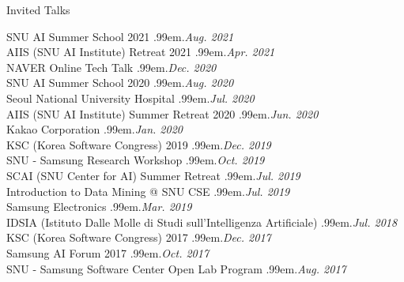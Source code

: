 \documentclass{resume} %
\makeatletter
\newcommand \Dotfill {\leavevmode \cleaders \hb@xt@ .99em{\hss .\hss }\hfill \kern \z@}
\makeatother
\begin{document}
\begin{rSection}{Invited Talks}

SNU AI Summer School 2021 \smallskip \Dotfill \emph{Aug. 2021} \\ 
AIIS (SNU AI Institute) Retreat 2021 \smallskip \Dotfill \emph{Apr. 2021} \\ 
NAVER Online Tech Talk \smallskip \Dotfill \emph{Dec. 2020} \\ 
SNU AI Summer School 2020 \smallskip \Dotfill \emph{Aug. 2020} \\ 
Seoul National University Hospital \smallskip \Dotfill \emph{Jul. 2020} \\ 
AIIS (SNU AI Institute) Summer Retreat 2020 \smallskip \Dotfill \emph{Jun. 2020}\\ 
Kakao Corporation \smallskip \Dotfill \emph{Jan. 2020} \\ 
KSC (Korea Software Congress) 2019 \smallskip \Dotfill \emph{Dec. 2019} \\ 
SNU - Samsung Research Workshop \smallskip \Dotfill \emph{Oct. 2019} \\ 
SCAI (SNU Center for AI) Summer Retreat \smallskip \Dotfill \emph{Jul. 2019} \\ 
Introduction to Data Mining @ SNU CSE \smallskip \Dotfill \emph{Jul. 2019} \\ 
Samsung Electronics \smallskip \Dotfill \emph{Mar. 2019} \\ 
IDSIA (Istituto Dalle Molle di Studi sull'Intelligenza Artificiale) \smallskip \Dotfill \emph{Jul. 2018} \\ 
KSC (Korea Software Congress) 2017 \smallskip \Dotfill \emph{Dec. 2017} \\ 
Samsung AI Forum 2017 \smallskip \Dotfill \emph{Oct. 2017} \\ 
SNU - Samsung Software Center Open Lab Program \smallskip \Dotfill \emph{Aug. 2017}

\end{rSection}

\end{document}
